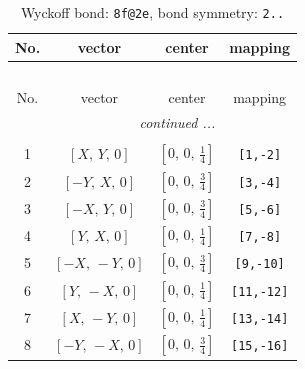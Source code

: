 \documentclass[fleqn,8pt]{jsarticle}
\begin{document}
\begin{longtable}{cccc}
\caption{Wyckoff bond: {\tt 8f@2e}, bond symmetry: {\tt 2..}}
 \\
 \hline \hline
No. & vector & center & mapping \\ \hline \endfirsthead

\multicolumn{3}{l}{\tablename\ \thetable{}} \\
 \hline \hline
No. & vector & center & mapping \\ \hline \endhead

 \hline \hline
\multicolumn{3}{r}{\footnotesize\it continued ...} \\ \endfoot

 \hline \hline
\multicolumn{3}{r}{} \\ \endlastfoot

1 & $\left[ X,\, Y,\, 0 \right]$ & $\left[ 0,\, 0,\, \frac{1}{4} \right]$ & {\tt [1,-2]} \\ \hline
2 & $\left[ - Y,\, X,\, 0 \right]$ & $\left[ 0,\, 0,\, \frac{3}{4} \right]$ & {\tt [3,-4]} \\ \hline
3 & $\left[ - X,\, Y,\, 0 \right]$ & $\left[ 0,\, 0,\, \frac{3}{4} \right]$ & {\tt [5,-6]} \\ \hline
4 & $\left[ Y,\, X,\, 0 \right]$ & $\left[ 0,\, 0,\, \frac{1}{4} \right]$ & {\tt [7,-8]} \\ \hline
5 & $\left[ - X,\, - Y,\, 0 \right]$ & $\left[ 0,\, 0,\, \frac{3}{4} \right]$ & {\tt [9,-10]} \\ \hline
6 & $\left[ Y,\, - X,\, 0 \right]$ & $\left[ 0,\, 0,\, \frac{1}{4} \right]$ & {\tt [11,-12]} \\ \hline
7 & $\left[ X,\, - Y,\, 0 \right]$ & $\left[ 0,\, 0,\, \frac{1}{4} \right]$ & {\tt [13,-14]} \\ \hline
8 & $\left[ - Y,\, - X,\, 0 \right]$ & $\left[ 0,\, 0,\, \frac{3}{4} \right]$ & {\tt [15,-16]} \\
\end{longtable}
\renewcommand{\arraystretch}{1.2}
\end{document}
